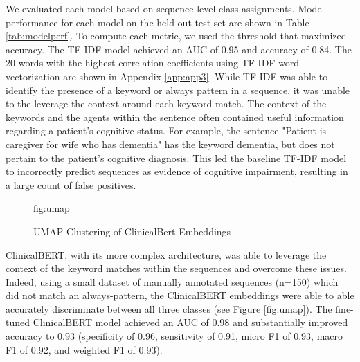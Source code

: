 \documentclass[pmlr,twocolumn,10pt]{jmlr} %
\begin{document}

We evaluated each model based on sequence level class assignments. Model performance for each model on the held-out test set are shown in Table \ref{tab:modelperf}. To compute each metric, we used the threshold that maximized accuracy. The TF-IDF model achieved an AUC of 0.95 and accuracy of 0.84. The 20 words with the highest correlation coefficients using TF-IDF word vectorization are shown in Appendix \ref{app:app3}. While TF-IDF was able to identify the presence of a keyword or always pattern in a sequence, it was unable to the leverage the context around each keyword match. The context of the keywords and the agents within the sentence often contained useful information regarding a patient's cognitive status. For example, the sentence "Patient is caregiver for wife who has dementia" has the keyword dementia, but does not pertain to the patient's cognitive diagnosis. This led the baseline TF-IDF model to incorrectly predict sequences as evidence of cognitive impairment, resulting in a large count of false positives.

\begin{figure}[htb]
\floatconts
{fig:umap}
{\caption{UMAP Clustering of ClinicalBert Embeddings}}
\centering 
\end{figure}

ClinicalBERT, with its more complex architecture, was able to leverage the context of the keyword matches within the sequences and overcome these issues. Indeed, using a small dataset of manually annotated sequences (n=150) which did not match an always-pattern, the ClinicalBERT embeddings were able to able accurately discriminate between all three classes (see Figure \ref{fig:umap}). The fine-tuned ClinicalBERT model achieved an AUC of 0.98 and substantially improved accuracy to 0.93 (specificity of 0.96, sensitivity of 0.91, micro F1 of 0.93, macro F1 of 0.92, and weighted F1 of 0.93). 
\end{document}
